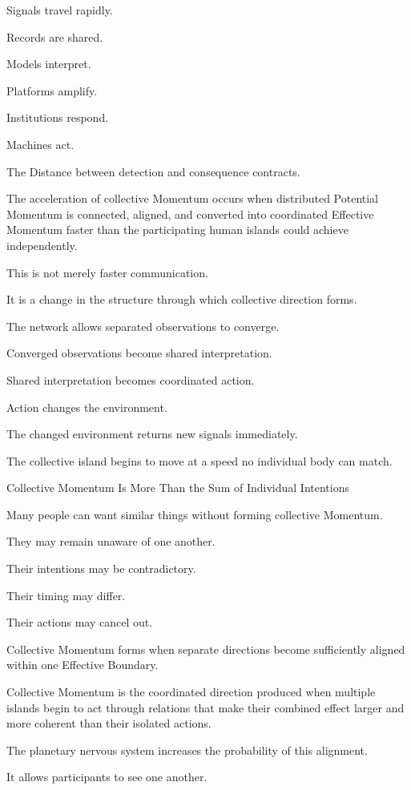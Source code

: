 Signals travel rapidly.

Records are shared.

Models interpret.

Platforms amplify.

Institutions respond.

Machines act.

The Distance between detection and consequence contracts.

The acceleration of collective Momentum occurs when distributed Potential Momentum is connected, aligned, and converted into coordinated Effective Momentum faster than the participating human islands could achieve independently.

This is not merely faster communication.

It is a change in the structure through which collective direction forms.

The network allows separated observations to converge.

Converged observations become shared interpretation.

Shared interpretation becomes coordinated action.

Action changes the environment.

The changed environment returns new signals immediately.

The collective island begins to move at a speed no individual body can match.

Collective Momentum Is More Than the Sum of Individual Intentions

Many people can want similar things without forming collective Momentum.

They may remain unaware of one another.

Their intentions may be contradictory.

Their timing may differ.

Their actions may cancel out.

Collective Momentum forms when separate directions become sufficiently aligned within one Effective Boundary.

Collective Momentum is the coordinated direction produced when multiple islands begin to act through relations that make their combined effect larger and more coherent than their isolated actions.

The planetary nervous system increases the probability of this alignment.

It allows participants to see one another.


